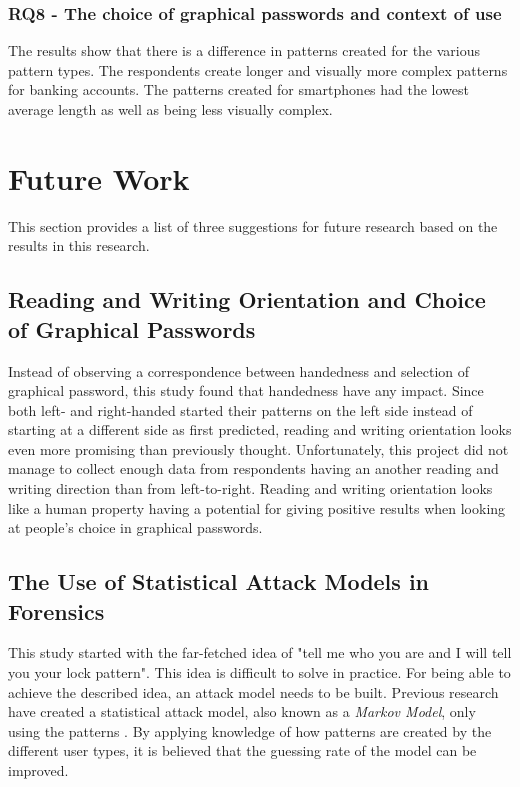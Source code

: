 \subsubsection*{RQ8 - The choice of graphical passwords and context of use}
The results show that there is a difference in patterns created for the various pattern types. The respondents create longer and visually more complex patterns for banking accounts. The patterns created for smartphones had the lowest average length as well as being less visually complex.

  \clearpage
  \section{Future Work}\label{sec:futureWork}

    This section provides a list of three suggestions for future research based on the results in this research.

    \subsection{Reading and Writing Orientation and Choice of Graphical Passwords}
      Instead of observing a correspondence between handedness and selection of graphical password, this study found that handedness have any impact. Since both left- and right-handed started their patterns on the left side instead of starting at a different side as first predicted, reading and writing orientation looks even more promising than previously thought. Unfortunately, this project did not manage to collect enough data from respondents having an another reading and writing direction than from left-to-right. Reading and writing orientation looks like a human property having a potential for giving positive results when looking at people's choice in graphical passwords. 

    \subsection{The Use of Statistical Attack Models in Forensics}
      This study started with the far-fetched idea of "tell me who you are and I will tell you your lock pattern". This idea is difficult to solve in practice. For being able to achieve the described idea, an attack model needs to be built. Previous research have created a statistical attack model, also known as a {\it Markov Model}, only using the patterns \cite{Uellenbeck}. By applying knowledge of how patterns are created by the different user types, it is believed that the guessing rate of the model can be improved. 

